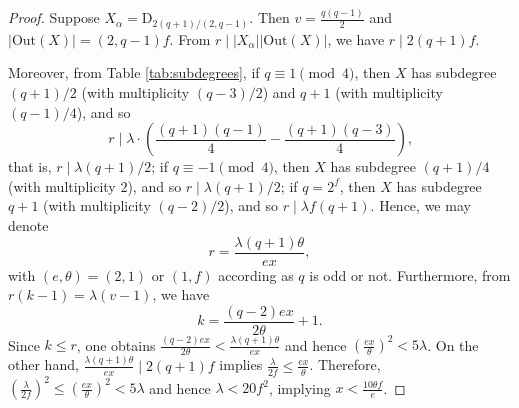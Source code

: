 \documentclass[a4paper,twopage,reqno,12pt]{amsart}
\theoremstyle{definition}
\numberwithin{equation}{section}
\newcommand{\Out}{\mathrm{Out}}
\renewcommand{\leq}{\leqslant}
\begin{document}
\begin{proof} 
Suppose $X_{\alpha}=\mathrm{D}_{2(q+1)/(2,q-1)}$. 
Then $v=\frac{q(q-1)}{2}$ and $|\Out(X)|=(2,q-1)f$.
From $r\mid |X_{\alpha}||\Out(X)|$, we have $r\mid 2(q+1)f$. 

Moreover, from Table \ref{tab:subdegrees}, 
if $q\equiv 1 \pmod{4}$, then $X$ has subdegree
$(q+1)/2$ (with multiplicity $(q-3)/2$) and 
$q+1$ (with multiplicity $(q-1)/4$), and so 
$$ r\mid \lambda\cdot \left(\frac{(q+1)(q-1)}{4}-\frac{(q+1)(q-3)}{4} 
  \right)\text{,}$$
that is, $r\mid \lambda (q+1)/2$;
if $q\equiv -1 \pmod{4}$, then $X$ has subdegree $(q+1)/4$ (with multiplicity $2$), and so $r\mid \lambda (q+1)/2$;
if $q=2^f$, then $X$ has subdegree
$q+1$ (with multiplicity $(q-2)/2$), 
and so $r\mid \lambda f(q+1)$.
Hence, we may denote 
\[
r=\frac{\lambda (q+1)\theta }{ex},
\]
with $(e,\theta )=(2,1)$ or $(1,f) $
according as $q$ is odd or not. 
Furthermore, from $r(k-1)=\lambda (v-1)$, we have
\[
k=\frac{(q-2)ex}{2\theta}+1.
\]
Since $k\le r$, one obtains $\frac{(q-2)ex}{2\theta}<  \frac{\lambda (q+1)\theta }{ex}$ and hence $\left(\frac{ex}{\theta}\right)^{2}< 5\lambda$. On the other hand, $\frac{\lambda (q+1)\theta }{ex} \mid 2(q+1)f$ implies $\frac{\lambda}{2f}\leq \frac{ex}{\theta} $. Therefore, $\left(\frac{\lambda}{2f}\right)^{2}\leq \left(\frac{ex}{\theta}\right)^{2}< 5\lambda$ and hence $\lambda <20f^{2}$, implying $x<\frac{10 \theta f}{e}$.  

\end{proof}
\end{document}
